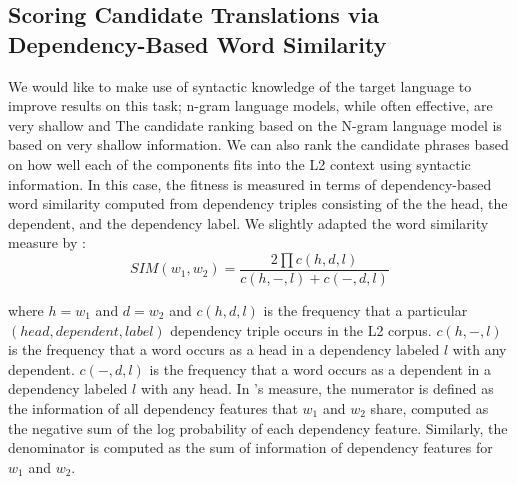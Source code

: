 \documentclass[11pt]{article}
\begin{document}
\subsection{Scoring Candidate Translations via Dependency-Based Word Similarity}
\label{sec:dependencySIM}
We would like to make use of syntactic knowledge of the target language to
improve results on this task; n-gram language models, while often effective,
are very shallow and 
The candidate ranking based on the N-gram language model is based on very
shallow information. We can also rank the candidate phrases based on how well
each of the components fits into the L2 context using syntactic information.
In this case, the fitness is measured in terms of dependency-based word
similarity computed from dependency triples consisting of the the head, the
dependent, and the dependency label. We slightly adapted the word similarity
measure by :
\begin{equation}
SIM(w_1,w_2) = \frac{2 \prod c(h,d,l)} 
{c(h,-,l) + c(-,d,l)}
\end{equation}

\noindent
where $h=w_1$ and $d=w_2$ and 
$c(h,d,l)$ is the frequency that a particular $(head, dependent, label)$ dependency triple occurs in the L2 corpus. $c(h,-,l)$ is the frequency that a word occurs as a head in a dependency labeled $l$ with any dependent. $c(-,d,l)$ is the frequency that a word occurs as a dependent in a dependency labeled $l$  with any head. 
In \cite{lin:98}'s measure, the numerator is defined as the information of all dependency features that $w_1$ and $w_2$ share, computed as the negative sum of the log probability of each dependency feature. Similarly, the denominator is computed as the sum of information of dependency features for $w_1$ and $w_2$. \\
\end{document}
